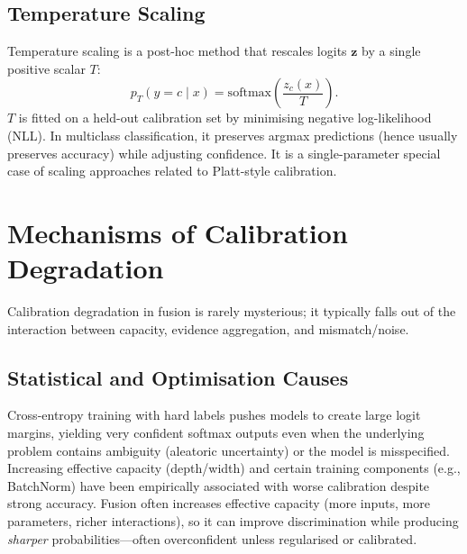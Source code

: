 \documentclass[11pt,a4paper,twocolumn]{article}
\begin{document}
\subsection{Temperature Scaling}
Temperature scaling is a post-hoc method that rescales logits $\mathbf{z}$
by a single positive scalar $T$:
\begin{equation}
  p_T(y\!=\!c \mid x) = \mathrm{softmax}\!\left(\frac{z_c(x)}{T}\right).
\end{equation}
$T$ is fitted on a held-out calibration set by minimising negative
log-likelihood (NLL).
In multiclass classification, it preserves argmax predictions (hence
usually preserves accuracy) while adjusting confidence.
It is a single-parameter special case of scaling approaches related to
Platt-style calibration.

\section{Mechanisms of Calibration Degradation}
\label{sec:mechanisms}

Calibration degradation in fusion is rarely mysterious; it typically falls
out of the interaction between capacity, evidence aggregation, and
mismatch/noise.

\subsection{Statistical and Optimisation Causes}
Cross-entropy training with hard labels pushes models to create large logit
margins, yielding very confident softmax outputs even when the underlying
problem contains ambiguity (aleatoric uncertainty) or the model is
misspecified.
Increasing effective capacity (depth/width) and certain training components
(e.g., BatchNorm) have been empirically associated with worse calibration
despite strong accuracy.
Fusion often increases effective capacity (more inputs, more parameters,
richer interactions), so it can improve discrimination while producing
\textit{sharper} probabilities---often overconfident unless regularised or
calibrated.
\end{document}
